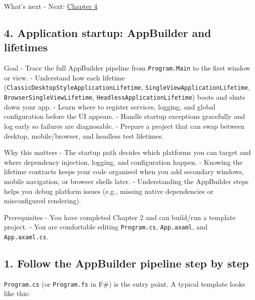 What's next - Next: \href{Chapter04.md}{Chapter 4}

\newpage

\subsection{4. Application startup: AppBuilder and
lifetimes}\label{application-startup-appbuilder-and-lifetimes}

Goal - Trace the full AppBuilder pipeline from
\passthrough{\lstinline!Program.Main!} to the first window or view. -
Understand how each lifetime
(\passthrough{\lstinline!ClassicDesktopStyleApplicationLifetime!},
\passthrough{\lstinline!SingleViewApplicationLifetime!},
\passthrough{\lstinline!BrowserSingleViewLifetime!},
\passthrough{\lstinline!HeadlessApplicationLifetime!}) boots and shuts
down your app. - Learn where to register services, logging, and global
configuration before the UI appears. - Handle startup exceptions
gracefully and log early so failures are diagnosable. - Prepare a
project that can swap between desktop, mobile/browser, and headless test
lifetimes.

Why this matters - The startup path decides which platforms you can
target and where dependency injection, logging, and configuration
happen. - Knowing the lifetime contracts keeps your code organised when
you add secondary windows, mobile navigation, or browser shells later. -
Understanding the AppBuilder steps helps you debug platform issues
(e.g., missing native dependencies or misconfigured rendering).

Prerequisites - You have completed Chapter 2 and can build/run a
template project. - You are comfortable editing
\passthrough{\lstinline!Program.cs!},
\passthrough{\lstinline!App.axaml!}, and
\passthrough{\lstinline!App.axaml.cs!}.

\subsection{1. Follow the AppBuilder pipeline step by
step}\label{follow-the-appbuilder-pipeline-step-by-step}

\passthrough{\lstinline!Program.cs!} (or
\passthrough{\lstinline!Program.fs!} in F\#) is the entry point. A
typical template looks like this:

